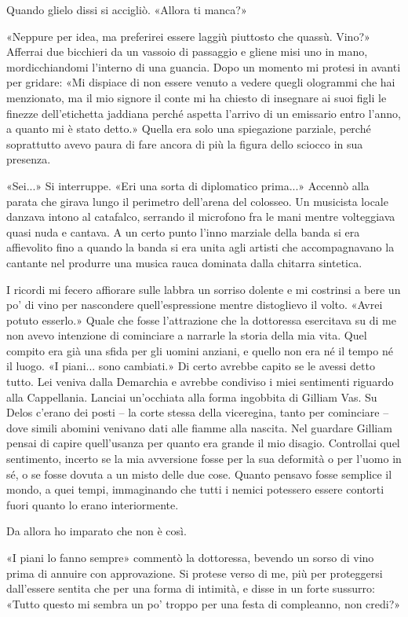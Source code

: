 Quando glielo dissi si accigliò. «Allora ti manca?»

«Neppure per idea, ma preferirei essere laggiù piuttosto che quassù.
Vino?» Afferrai due bicchieri da un vassoio di passaggio e gliene misi
uno in mano, mordicchiandomi l'interno di una guancia. Dopo un momento
mi protesi in avanti per gridare: «Mi dispiace di non essere venuto a
vedere quegli ologrammi che hai menzionato, ma il mio signore il conte
mi ha chiesto di insegnare ai suoi figli le finezze dell'etichetta
jaddiana perché aspetta l'arrivo di un emissario entro l'anno, a quanto
mi è stato detto.» Quella era solo una spiegazione parziale, perché
soprattutto avevo paura di fare ancora di più la figura dello sciocco in
sua presenza.

«Sei...» Si interruppe. «Eri una sorta di diplomatico prima...» Accennò
alla parata che girava lungo il perimetro dell'arena del colosseo. Un
musicista locale danzava intono al catafalco, serrando il microfono fra
le mani mentre volteggiava quasi nuda e cantava. A un certo punto l'inno
marziale della banda si era affievolito fino a quando la banda si era
unita agli artisti che accompagnavano la cantante nel produrre una
musica rauca dominata dalla chitarra sintetica.

I ricordi mi fecero affiorare sulle labbra un sorriso dolente e mi
costrinsi a bere un po' di vino per nascondere quell'espressione mentre
distoglievo il volto. «Avrei potuto esserlo.» Quale che fosse
l'attrazione che la dottoressa esercitava su di me non avevo intenzione
di cominciare a narrarle la storia della mia vita. Quel compito era già
una sfida per gli uomini anziani, e quello non era né il tempo né il
luogo. «I piani... sono cambiati.» Di certo avrebbe capito se le avessi
detto tutto. Lei veniva dalla Demarchia e avrebbe condiviso i miei
sentimenti riguardo alla Cappellania. Lanciai un'occhiata alla forma
ingobbita di Gilliam Vas. Su Delos c'erano dei posti -- la corte stessa
della viceregina, tanto per cominciare -- dove simili abomini venivano
dati alle fiamme alla nascita. Nel guardare Gilliam pensai di capire
quell'usanza per quanto era grande il mio disagio. Controllai quel
sentimento, incerto se la mia avversione fosse per la sua deformità o
per l'uomo in sé, o se fosse dovuta a un misto delle due cose. Quanto
pensavo fosse semplice il mondo, a quei tempi, immaginando che tutti i
nemici potessero essere contorti fuori quanto lo erano interiormente.

Da allora ho imparato che non è così.

«I piani lo fanno sempre» commentò la dottoressa, bevendo un sorso di
vino prima di annuire con approvazione. Si protese verso di me, più per
proteggersi dall'essere sentita che per una forma di intimità, e disse
in un forte sussurro: «Tutto questo mi sembra un po' troppo per una
festa di compleanno, non credi?»

